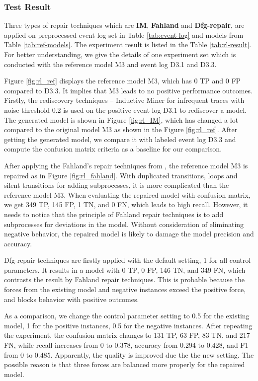 \subsubsection{Test Result}
Three types of repair techniques which are \textbf{IM}, \textbf{Fahland} and \textbf{Dfg-repair}, are applied on preprocessed event log set in Table \ref{tab:event-log} and models from Table \ref{tab:ref-models}. The experiment result is listed in the Table \ref{tab:rl-result}. For better understanding, we give the details of one experiment set which is conducted with the reference model M3 and event log D3.1 and D3.3.  

Figure \ref{fig:rl_ref} displays the reference model M3, which has 0 TP and 0 FP compared to D3.3. It implies that M3 leads to no positive performance outcomes. Firstly, the rediscovery techniques -- Inductive Miner for infrequent traces with noise threshold 0.2 is used on the positive event log D3.1 to rediscover a model. The generated model is shown in Figure \ref{fig:rl_IM}, which has changed a lot compared to the original model M3 as shown in the Figure \ref{fig:rl_ref}. After getting the generated model, we compare it with labeled event log D3.3 and compute the confusion matrix criteria as a baseline for our comparison. 

After applying the Fahland's repair techniques from \cite{fahland2015model}, the reference model M3 is repaired as in Figure \ref{fig:rl_fahland}. With duplicated transitions, loops and silent transitions for adding subprocesses, it is more complicated than the reference model M3. When evaluating the repaired model with confusion matrix, we get 349 TP, 145 FP, 1 TN, and 0 FN, which leads to high recall. However, it needs to notice that the principle of Fahland repair techniques is to add subprocesses for deviations in the model. Without consideration of eliminating negative behavior, the repaired model is likely to damage the model precision and accuracy.

Dfg-repair techniques are firstly applied with the default setting, 1 for all control parameters. It results in a model with 0 TP, 0 FP, 146 TN, and 349 FN,  which contrasts the result by Fahland repair techniques. This is probable because the forces from the existing model and negative instances exceed the positive force, and blocks  behavior with positive outcomes. 

As a comparison, we change the control parameter setting to 0.5 for the existing model, 1 for the positive instances, 0.5 for the negative instances. After repeating the experiment, the confusion matrix changes to 131 TP, 63 FP, 83 TN, and 217 FN, while recall increases from 0 to 0.378, accuracy from 0.294 to 0.428, and F1 from 0 to 0.485. Apparently, the quality is improved due the the new setting. The possible reason is that three forces are balanced more properly for the repaired model.

